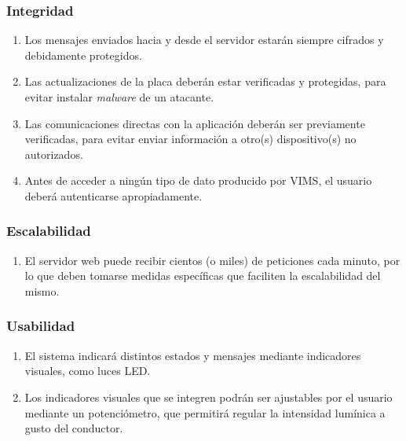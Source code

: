 \subsubsection{Integridad}
\begin{enumerate}[resume, label=\textbf{\texttt{RNF-\arabic*}}]
  \item\label{nf:enc} Los mensajes enviados hacia y desde el servidor estarán siempre
  cifrados y debidamente protegidos.
  \item\label{nf:ota-int} Las actualizaciones de la placa deberán estar verificadas
  y protegidas, para evitar instalar \textit{malware} de un atacante.
  \item\label{nf:s2a-int} Las comunicaciones directas con la aplicación deberán
  ser previamente verificadas, para evitar enviar información a otro(s) dispositivo(s)
  no autorizados.
  \item\label{nf:auth} Antes de acceder a ningún tipo de dato producido por \ac{VIMS},
  el usuario deberá autenticarse apropiadamente.
\end{enumerate}

\subsubsection{Escalabilidad}
\begin{enumerate}[resume, label=\textbf{\texttt{RNF-\arabic*}}]
  \item\label{nf:server-scalability} El servidor web puede recibir cientos (o miles)
  de peticiones cada minuto, por lo que deben tomarse medidas específicas que faciliten
  la escalabilidad del mismo.
\end{enumerate}

\subsubsection{Usabilidad}
\begin{enumerate}[resume, label=\textbf{\texttt{RNF-\arabic*}}]
  \item\label{nf:s-data} El sistema indicará distintos estados y mensajes mediante
  indicadores visuales, como luces LED.
  \item\label{nf:led-bright} Los indicadores visuales que se integren podrán ser ajustables
  por el usuario mediante un potenciómetro, que permitirá regular la intensidad lumínica
  a gusto del conductor.
\end{enumerate}
